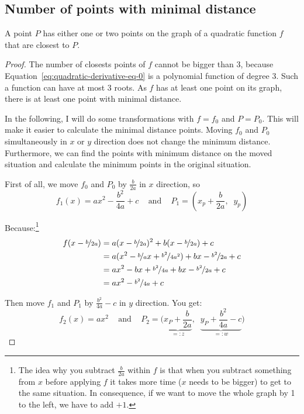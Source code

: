 \subsection{Number of points with minimal distance}
\begin{theorem}
    A point $P$ has either one or two points on the graph of a
    quadratic function $f$ that are closest to $P$.
\end{theorem}

\begin{proof}
The number of closests points of $f$ cannot be bigger than 3, because
Equation~\ref{eq:quadratic-derivative-eq-0} is a polynomial function
of degree 3. Such a function can have at most 3 roots. As $f$ has
at least one point on its graph, there is at least one point with
minimal distance.

In the following, I will do some transformations with $f = f_0$ and
$P = P_0$. This will make it easier to calculate the minimal distance
points. Moving $f_0$ and $P_0$ simultaneously in $x$ or $y$ direction does
not change the minimum distance. Furthermore, we can find the
points with minimum distance on the moved situation and calculate
the minimum points in the original situation.

First of all, we move $f_0$ and $P_0$ by $\frac{b}{2a}$ in $x$ direction, so
\[f_1(x) = ax^2 - \frac{b^2}{4a} + c \;\;\;\text{ and }\;\;\; P_1 = \left (x_p+\frac{b}{2a},\;\; y_p \right )\]

Because:\footnote{The idea why you subtract $\frac{b}{2a}$ within
$f$ is that when you subtract something from $x$ before applying
$f$ it takes more time ($x$ needs to be bigger) to get to the same
situation. In consequence, if we want to move the whole graph by 1
to the left, we have to add $+1$.}
\begin{align}
    f(x-\nicefrac{b}{2a}) &= a (x-\nicefrac{b}{2a})^2 + b (x-\nicefrac{b}{2a}) + c\\
    &= a (x^2 - \nicefrac{b}{a} x + \nicefrac{b^2}{4a^2}) + bx - \nicefrac{b^2}{2a} + c\\
    &= ax^2 - bx + \nicefrac{b^2}{4a} + bx - \nicefrac{b^2}{2a} + c\\
    &= ax^2 -\nicefrac{b^2}{4a} + c
\end{align}


Then move $f_1$ and $P_1$ by $\frac{b^2}{4a}-c$ in $y$ direction. You get:
\[f_2(x) = ax^2\;\;\;\text{ and }\;\;\; P_2 = \Big (\underbrace{x_P+\frac{b}{2a}}_{=: z},\;\; \underbrace{y_P+\frac{b^2}{4a}-c}_{=: w} \Big )\]


\end{proof}
